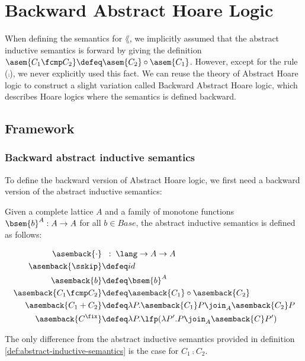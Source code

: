 \chapter{Backward Abstract Hoare Logic}

When defining the semantics for $\lang$, we implicitly assumed that the
abstract inductive semantics is forward by giving the definition $\asem{C_1
\fcmp C_2} \defeq \asem{C_2} \circ \asem{C_1}$. However, except for the rule
($\fcmp$), we never explicitly used this fact. We can reuse the theory of
Abstract Hoare logic to construct a slight variation called Backward Abstract
Hoare logic, which describes Hoare logics where the semantics is defined
backward.

\section{Framework}

\subsection{Backward abstract inductive semantics}

To define the backward version of Abstract Hoare logic, we first need a
backward version of the abstract inductive semantics:

\begin{definition}
  Given a complete lattice $A$ and a family of monotone functions $\bsem{b}^A :
  A \to A$ for all $b \in Base$, the abstract inductive semantics is defined as
  follows:

  \begin{align*}
      \asemback{\cdot}         & \;\;:\; \lang \to A \to A \\
      \asemback{\sskip}        &\defeq id \\
      \asemback{b}             &\defeq \bsem{b}^A \\
      \asemback{C_1 \fcmp C_2} &\defeq \asemback{C_1} \circ \asemback{C_2} \\
      \asemback{C_1 + C_2}     &\defeq \lambda P . \asemback{C_1} P \join_A \asemback{C_2} P \\
      \asemback{C^\fix}        &\defeq \lambda P . \lfp(\lambda P'. P \join_A \asemback{C} P')
  \end{align*}
\end{definition}

The only difference from the abstract inductive semantics provided in
definition \ref{def:abstract-inductive-semantics} is the case for $C_1 \fcmp
C_2$.

